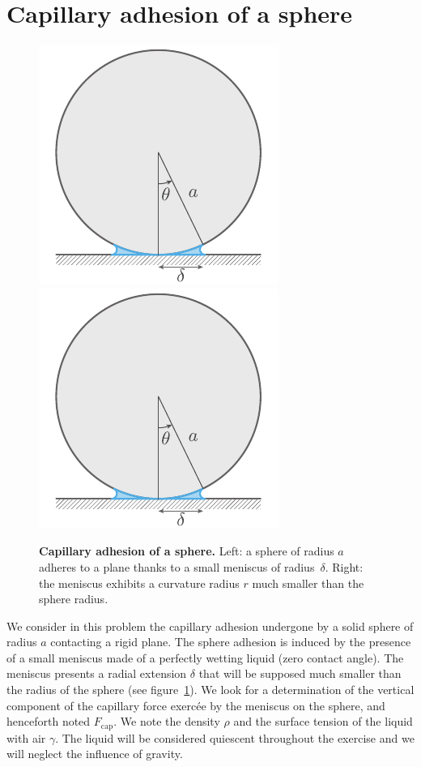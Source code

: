 \documentclass[11pt,a4paper]{article}
\begin{document}
\section{Capillary adhesion of a sphere}
\begin{figure}[ht]
    \centering
    \includegraphics[valign=m,page=1]{adhesion_sphere.pdf}
    \hspace{1cm}
    \includegraphics[valign=m,page=2]{adhesion_sphere.pdf}
    \caption{\textbf{Capillary adhesion of a sphere.} Left: a sphere of radius $a$ adheres to a plane thanks to a small meniscus of radius~$\delta$. Right: the meniscus exhibits a curvature radius $r$ much smaller than the sphere radius.}
    \label{fig:adhesion}
\end{figure}
\noindent We consider in this problem the capillary adhesion undergone by a solid sphere of radius $a$ contacting a rigid plane. The sphere adhesion is induced by the presence of a small meniscus made of a perfectly wetting liquid (zero contact angle). The meniscus presents a radial extension $\delta$ that will be supposed much smaller than the radius of the sphere (see figure~\ref{fig:adhesion}). We look for a determination of the vertical component of the capillary force exercée by the meniscus on the sphere, and henceforth noted $F_\text{cap}$. We note the density $\rho$ and the surface tension of the liquid with air $\gamma$. The liquid will be considered quiescent throughout the exercise and we will neglect the influence of gravity.
\end{document}
